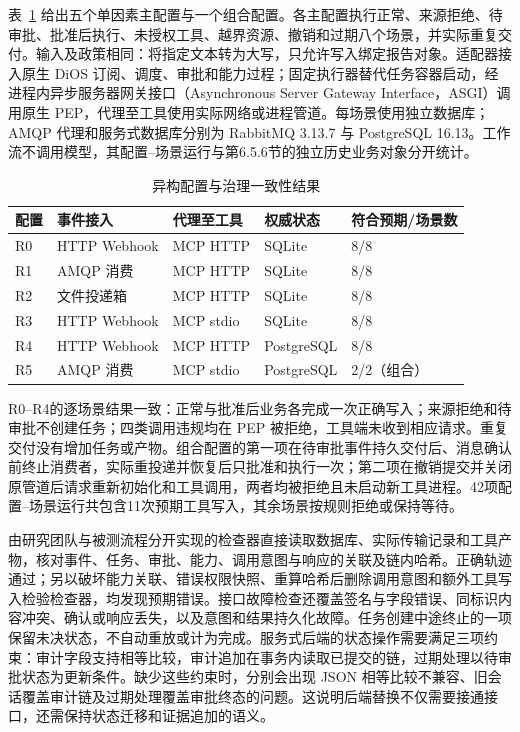 表~\ref{tab:heterogeneity-rr022} 给出五个单因素主配置与一个组合配置。各主配置执行正常、来源拒绝、待审批、批准后执行、未授权工具、越界资源、撤销和过期八个场景，并实际重复交付。输入及政策相同：将指定文本转为大写，只允许写入绑定报告对象。适配器接入原生 DiOS 订阅、调度、审批和能力过程；固定执行器替代任务容器启动，经进程内异步服务器网关接口（Asynchronous Server Gateway Interface，ASGI）调用原生 PEP，代理至工具使用实际网络或进程管道。每场景使用独立数据库；AMQP 代理和服务式数据库分别为 RabbitMQ 3.13.7 与 PostgreSQL 16.13。工作流不调用模型，其配置--场景运行与第6.5.6节的独立历史业务对象分开统计。

\begin{table}[htbp]
\centering
\caption{异构配置与治理一致性结果}
\label{tab:heterogeneity-rr022}
\small
\begin{tabular}{lllll}
\toprule
配置 & 事件接入 & 代理至工具 & 权威状态 & 符合预期/场景数 \\
\midrule
R0 & HTTP Webhook & MCP HTTP & SQLite & 8/8 \\
R1 & AMQP 消费 & MCP HTTP & SQLite & 8/8 \\
R2 & 文件投递箱 & MCP HTTP & SQLite & 8/8 \\
R3 & HTTP Webhook & MCP stdio & SQLite & 8/8 \\
R4 & HTTP Webhook & MCP HTTP & PostgreSQL & 8/8 \\
R5 & AMQP 消费 & MCP stdio & PostgreSQL & 2/2（组合） \\
\bottomrule
\end{tabular}
\end{table}

R0--R4的逐场景结果一致：正常与批准后业务各完成一次正确写入；来源拒绝和待审批不创建任务；四类调用违规均在 PEP 被拒绝，工具端未收到相应请求。重复交付没有增加任务或产物。组合配置的第一项在待审批事件持久交付后、消息确认前终止消费者，实际重投递并恢复后只批准和执行一次；第二项在撤销提交并关闭原管道后请求重新初始化和工具调用，两者均被拒绝且未启动新工具进程。42项配置--场景运行共包含11次预期工具写入，其余场景按规则拒绝或保持等待。

由研究团队与被测流程分开实现的检查器直接读取数据库、实际传输记录和工具产物，核对事件、任务、审批、能力、调用意图与响应的关联及链内哈希。正确轨迹通过；另以破坏能力关联、错误权限快照、重算哈希后删除调用意图和额外工具写入检验检查器，均发现预期错误。接口故障检查还覆盖签名与字段错误、同标识内容冲突、确认或响应丢失，以及意图和结果持久化故障。任务创建中途终止的一项保留未决状态，不自动重放或计为完成。服务式后端的状态操作需要满足三项约束：审计字段支持相等比较，审计追加在事务内读取已提交的链，过期处理以待审批状态为更新条件。缺少这些约束时，分别会出现 JSON 相等比较不兼容、旧会话覆盖审计链及过期处理覆盖审批终态的问题。这说明后端替换不仅需要接通接口，还需保持状态迁移和证据追加的语义。

